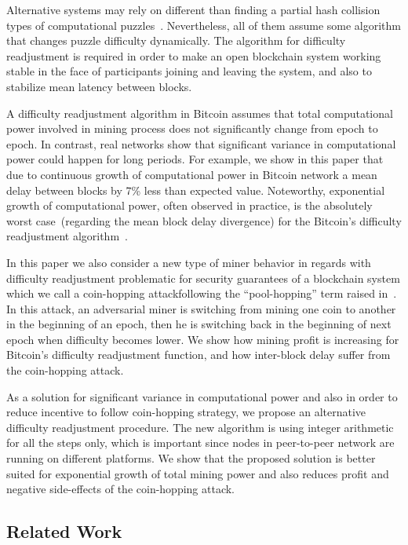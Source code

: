 \documentclass[]{llncs}
\newcommand{\attackname}{coin-hopping attack}
\begin{document}
Alternative systems may rely on different than finding a partial hash collision types of computational puzzles~\cite{miller2014permacoin,biryukov2017equihash}. Nevertheless, all of them assume some algorithm that changes puzzle difficulty dynamically. The algorithm for difficulty readjustment is required in order to make an open blockchain system working stable in the face of participants joining and leaving the system, and also to stabilize mean latency between blocks. 

A difficulty readjustment algorithm in Bitcoin assumes that total computational power involved in mining process does not significantly change from epoch to epoch. In contrast, real networks show that significant variance in computational power could happen for long periods.
For example, we show in this paper that due to continuous growth of computational power in Bitcoin network a mean delay between blocks by 7\% less than expected value.
Noteworthy, exponential growth of computational power, often observed in practice, is the absolutely worst case~(regarding the mean block delay divergence) for the Bitcoin’s difficulty readjustment algorithm~\cite{kraft2015difficulty}.
 
In this paper we also consider a new type of miner behavior in regards with difficulty readjustment problematic for security guarantees of a blockchain system which we call a \attackname following the ``pool-hopping'' term raised in~\cite{rosenfeld2011analysis}. In this attack, an adversarial miner is switching from mining one coin to another in the beginning of an epoch, then he is switching back in the beginning of next epoch when difficulty becomes lower. We show how mining profit is increasing for Bitcoin's difficulty readjustment function, and how inter-block delay suffer from the \attackname.

As a solution for significant variance in computational power and also in order to reduce incentive to follow coin-hopping strategy, we propose an alternative difficulty readjustment procedure. The new algorithm is using integer arithmetic for all the steps only, which is important since nodes in peer-to-peer network are running on different platforms. We show that the proposed solution is better suited for exponential growth of total mining power and also reduces profit and negative side-effects of the coin-hopping attack.

\subsection{Related Work}
\end{document}
